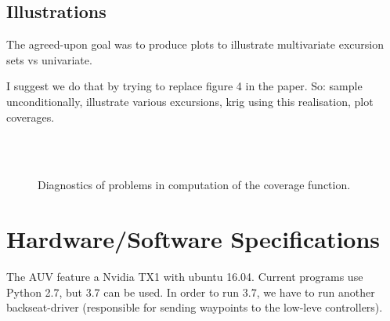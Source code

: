 \documentclass[a4paper,10pt]{article}
\begin{document}
\subsection{Illustrations}
The agreed-upon goal was to produce plots to illustrate multivariate excursion
sets vs univariate.

I suggest we do that by trying to replace figure 4 in the paper.
So: sample unconditionally, illustrate various excursions, krig using this
realisation, plot coverages.

\begin{figure}[tbh!p]
\centering
{}\\
\\
\caption{Diagnostics of problems in computation of the coverage function.}
\label{fig:example_inv_prob}
\end{figure}

\section{Hardware/Software Specifications}
The AUV feature a Nvidia TX1 with ubuntu 16.04. Current programs use Python
2.7, but 3.7 can be used.
In order to run 3.7, we have to run
another backseat-driver (responsible for sending waypoints to the low-leve
controllers).
\end{document}
